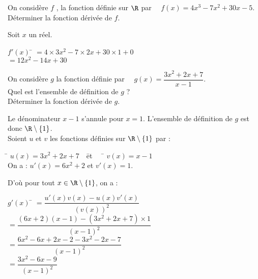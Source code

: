 \documentclass[a4paper,11pt,exos]{nsi}
\begin{document}
\maketitle

On considère $f$ , la fonction définie sur $\R$ par $\quad f(x)=4x^3-7x^2+30x-5$.\\
Déterminer la fonction dérivée de $f$.\\[.5em]
\textcolor{UGLiBlue}{
    Soit $x$ un réel.
    \begin{tabbing}
        $f'(x)$ \= $=4\times 3x^2-7\times 2x+30\times 1+0$\\
        \> $=12x^2-14x+30$
    \end{tabbing}
}


On considère $g$ la fonction définie par $\quad g(x)=\dfrac{3x^2+2x+7}{x-1}$.\\[.5em]
Quel est l'ensemble de définition de $g$ ?\\
Déterminer la fonction dérivée de $g$.\\[.5em]
\textcolor{UGLiBlue}{
    Le dénominateur $x-1$ s'annule pour $x=1$.    L'ensemble de définition de $g$ est donc $\R\setminus\{1\}$.\\
    Soient $u$ et $v$ les fonctions définies sur $\R\setminus\{1\}$ par :
    \begin{tabbing}
        \hspace*{1.5cm}\= $u(x)=3x^2+2x+7\quad$\= et $\quad$  \= $v(x)=x-1$\\
        On a :  \>$u'(x)=6x^2+2$\> et \>$v'(x)=1$.
    \end{tabbing}
    D'où pour tout $x\in\R\setminus\{1\}$, on a :
    \begin{tabbing}
        $g'(x)$ \= $=\dfrac{u'(x)v(x)-u(x)v'(x)}{(v(x))^2}$\\
        \> $=\dfrac{(6x+2)(x-1)-(3x^2+2x+7)\times 1}{(x-1)^2}$\\
        \> $=\dfrac{6x^2-6x+2x-2-3x^2-2x-7}{(x-1)^2}$\\
        \> $=\dfrac{3x^2-6x-9}{(x-1)^2}$
    \end{tabbing}
}
\end{document}
